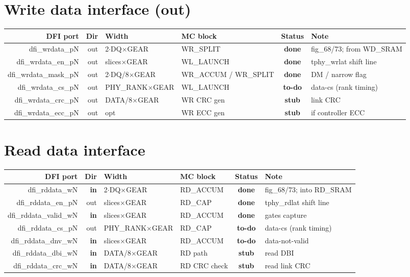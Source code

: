 \documentclass[9pt]{extarticle}
\newcommand{\done}{\textbf{\textcolor{gdone}{done}}}
\newcommand{\stub}{\textbf{\textcolor{gstub}{stub}}}
\newcommand{\todo}{\textbf{\textcolor{gtodo}{to-do}}}
\newenvironment{portmap}{%
  \footnotesize\begin{longtable}{N D W B S X}\toprule
  \textbf{DFI port} & \textbf{Dir} & \textbf{Width} & \textbf{MC block} & \textbf{Status} & \textbf{Note}\\ \midrule\endhead}
  {\bottomrule\end{longtable}}
\begin{document}
\section{Write data interface (out)}
\begin{portmap}
dfi\_wrdata\_pN & out & 2$\cdot$DQ$\times$GEAR & WR\_SPLIT & \done & fig\_68/73; from WD\_SRAM\\
dfi\_wrdata\_en\_pN & out & slices$\times$GEAR & WL\_LAUNCH & \done & tphy\_wrlat shift line\\
dfi\_wrdata\_mask\_pN & out & 2$\cdot$DQ/8$\times$GEAR & WR\_ACCUM / WR\_SPLIT & \done & DM / narrow flag\\
dfi\_wrdata\_cs\_pN & out & PHY\_RANK$\times$GEAR & WL\_LAUNCH & \todo & data-cs (rank timing)\\
dfi\_wrdata\_crc\_pN & out & DATA/8$\times$GEAR & WR CRC gen & \stub & link CRC\\
dfi\_wrdata\_ecc\_pN & out & opt & WR ECC gen & \stub & if controller ECC\\
\end{portmap}

\section{Read data interface}
\begin{portmap}
dfi\_rddata\_wN & \textbf{in} & 2$\cdot$DQ$\times$GEAR & RD\_ACCUM & \done & fig\_68/73; into RD\_SRAM\\
dfi\_rddata\_en\_pN & out & slices$\times$GEAR & RD\_CAP & \done & tphy\_rdlat shift line\\
dfi\_rddata\_valid\_wN & \textbf{in} & slices$\times$GEAR & RD\_ACCUM & \done & gates capture\\
dfi\_rddata\_cs\_pN & out & PHY\_RANK$\times$GEAR & RD\_CAP & \todo & data-cs (rank timing)\\
dfi\_rddata\_dnv\_wN & \textbf{in} & slices$\times$GEAR & RD\_ACCUM & \todo & data-not-valid\\
dfi\_rddata\_dbi\_wN & \textbf{in} & DATA/8$\times$GEAR & RD path & \stub & read DBI\\
dfi\_rddata\_crc\_wN & \textbf{in} & DATA/8$\times$GEAR & RD CRC check & \stub & read link CRC\\
\end{portmap}
\end{document}
